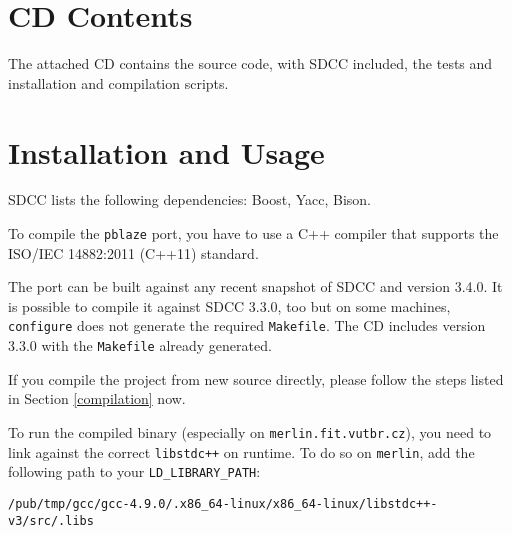 \chapter{CD Contents}

The attached CD contains the source code, with SDCC included, the tests and installation and compilation scripts.

\chapter{Installation and Usage}

SDCC lists the following dependencies: Boost, Yacc, Bison.

To compile the \texttt{pblaze} port, you have to use a C++ compiler that supports the ISO/IEC 14882:2011 (C++11) standard.

The port can be built against any recent snapshot of SDCC and version 3.4.0. It is possible to compile it against SDCC 3.3.0, too but on some machines, \texttt{configure} does not generate the required \texttt{Makefile}. The CD includes version 3.3.0 with the \texttt{Makefile} already generated.

If you compile the project from new source directly, please follow the steps listed in Section \ref{compilation} now.

To run the compiled binary (especially on \texttt{merlin.fit.vutbr.cz}), you need to link against the correct \texttt{libstdc++} on runtime.
To do so on \texttt{merlin}, add the following path to your \texttt{LD\_LIBRARY\_PATH}:

\begin{center}\verb|/pub/tmp/gcc/gcc-4.9.0/.x86_64-linux/x86_64-linux/libstdc++-v3/src/.libs|\end{center}

